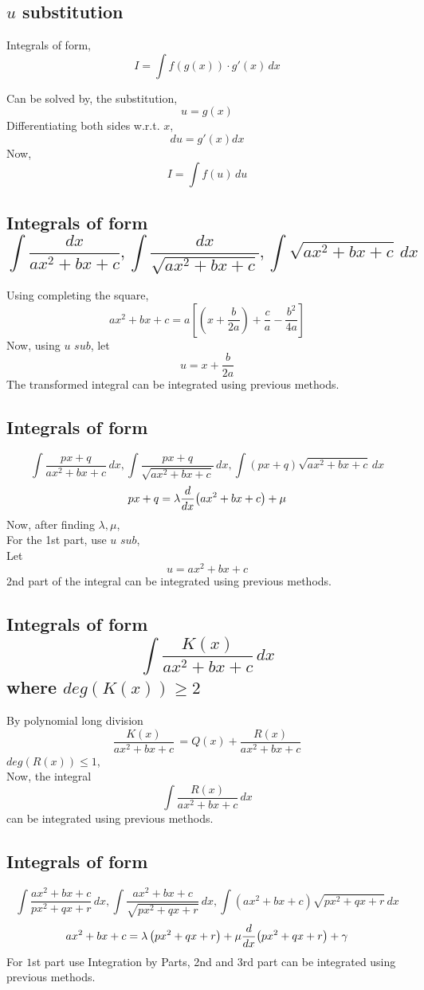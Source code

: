 \documentclass{article}
\begin{document}
\subsection{$u$ substitution}
Integrals of form, $$I=\int f(g(x))\cdot g'(x) \, dx$$

Can be solved by, the substitution,
$$u=g(x)$$ Differentiating both sides w.r.t. $x$,
$$du=g'(x)dx$$
Now, $$I=\int f(u) \, du$$
\subsection{Integrals of form $$\int \dfrac{dx}{ax^2+bx+c}, \int \dfrac{dx}{\sqrt{ax^2+bx+c}}, \int \sqrt{ax^2+bx+c} \, dx$$}
Using completing the square, $$ax^2+bx+c=a \left[\left(x+\dfrac{b}{2a}\right)+\dfrac{c}{a}-\dfrac{b^2}{4a}\right]$$
Now, using $\textit{u sub}$, let $$u=x+\dfrac{b}{2a}$$
The transformed integral can be integrated using previous methods.

\subsection{Integrals of form}
$$\int \dfrac{px+q}{ax^2+bx+c} \, dx, \int \dfrac{px+q}{\sqrt{ax^2+bx+c}} \, dx, \int \left(px+q\right)\sqrt{ax^2+bx+c} \, dx $$
$$px+q=\lambda \dv{x}(ax^2+bx+c) +\mu$$
Now, after finding $\lambda,  \mu$, \\For the 1st part, use $\textit{u sub}$,\\ Let $$u= ax^2+bx+c$$
2nd part of the integral can be integrated using previous methods.
\subsection{Integrals of form $$\int \dfrac{K(x)}{ax^2+bx+c} \, dx$$ where $deg(K(x))\ge2$}

By polynomial long division $$\dfrac{K(x)}{ax^2+bx+c} \,=Q(x) + \dfrac{R(x)}{ax^2+bx+c}$$
$deg(R(x))\le 1$,
\\ Now, the integral $$\int \dfrac{R(x)}{ax^2+bx+c} \, dx$$
can be integrated using previous methods.

\subsection{Integrals of form}
$$\int \dfrac{ax^2+bx+c}{px^2+qx+r} \, dx, \int \dfrac{ax^2+bx+c}{\sqrt{px^2+qx+r}} \, dx, \int \left(ax^2+bx+c\right)\sqrt{px^2+qx+r} \, dx$$
$$ax^2+bx+c= \lambda \left(px^2+qx+r\right)+\mu \dv{x}(px^2+qx+r)+\gamma$$
For $1$st part use Integration by Parts, 2nd and 3rd part can be integrated using previous methods.
\end{document}

